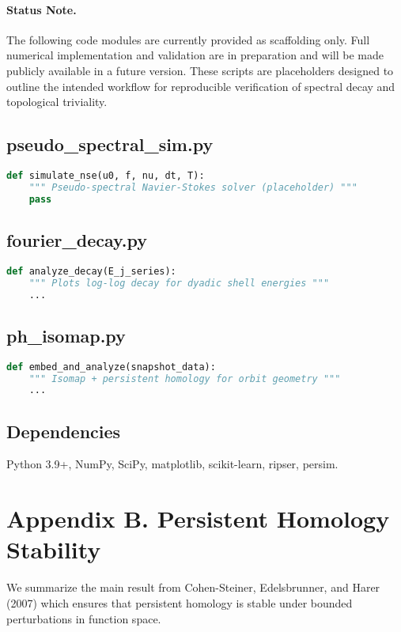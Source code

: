 \documentclass[11pt]{article}
\theoremstyle{definition}
\begin{document}
\paragraph{Status Note.}
The following code modules are currently provided as scaffolding only. Full numerical implementation and validation are in preparation and will be made publicly available in a future version. These scripts are placeholders designed to outline the intended workflow for reproducible verification of spectral decay and topological triviality.

\subsection*{pseudo\_spectral\_sim.py}
\begin{lstlisting}[language=Python]
def simulate_nse(u0, f, nu, dt, T):
    """ Pseudo-spectral Navier-Stokes solver (placeholder) """
    pass
\end{lstlisting}

\subsection*{fourier\_decay.py}
\begin{lstlisting}[language=Python]
def analyze_decay(E_j_series):
    """ Plots log-log decay for dyadic shell energies """
    ...
\end{lstlisting}

\subsection*{ph\_isomap.py}
\begin{lstlisting}[language=Python]
def embed_and_analyze(snapshot_data):
    """ Isomap + persistent homology for orbit geometry """
    ...
\end{lstlisting}

\subsection*{Dependencies}
Python 3.9+, NumPy, SciPy, matplotlib, scikit-learn, ripser, persim.

\section{Appendix B. Persistent Homology Stability}
\label{sec:appendixB}

We summarize the main result from Cohen-Steiner, Edelsbrunner, and Harer (2007) which ensures that persistent homology is stable under bounded perturbations in function space.
\end{document}
